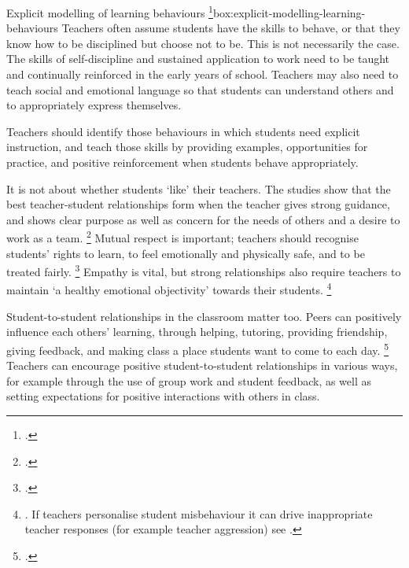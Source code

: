 \documentclass{grattan}
\begin{document}
\begin{verysmallbox}[t]{Explicit modelling of learning behaviours%
\footcites{Brophy2006HistoryResearchClassroom}{Watkins2005ClassroomsLearningCommunities}}{box:explicit-modelling-learning-behaviours}
Teachers often assume students have the skills to behave, or that they know how to be disciplined but choose not to be. This is not necessarily the case. The skills of self-discipline and sustained application to work need to be taught and continually reinforced in the early years of school. Teachers may also need to teach social and emotional language so that students can understand others and to appropriately express themselves.

Teachers should identify those behaviours in which students need explicit instruction, and teach those skills by providing examples, opportunities for practice, and positive reinforcement when students behave appropriately.
\end{verysmallbox}

It is not about whether students `like' their teachers. The studies show that the best teacher-student relationships form when the teacher gives strong guidance, and shows clear purpose as well as concern for the needs of others and a desire to work as a team.%
    \footcite{Marzano2003ClassroomManagementWorks}
Mutual respect is important; teachers should recognise students' rights to learn, to feel emotionally and physically safe, and to be treated fairly.%
    \footcites{Lewis2011DevelopmentalManagementApproach}{Rogers2015ClassroomBehaviourPractical} Empathy is vital, but strong relationships also require teachers to maintain `a healthy emotional objectivity' towards their students.%
    \footnote{\textcites{Hattie2008visiblelearningsynthesis}{Marzano2003ClassroomManagementWorks}. If teachers personalise student misbehaviour it can drive inappropriate teacher responses (for example teacher aggression) see \textcite{RileyBrew2010WhyDidYouDoThat}.}

Student-to-student relationships in the classroom matter too. Peers can positively influence each others' learning, through helping, tutoring, providing friendship, giving feedback, and making class a place students want to come to each day.%
    \footcite{Wilkinson-Fung-2002-Small-group-composition-peer-effects}
Teachers can encourage positive student-to-student relationships in various ways, for example through the use of group work and student feedback, as well as setting expectations for positive interactions with others in class.
\end{document}

